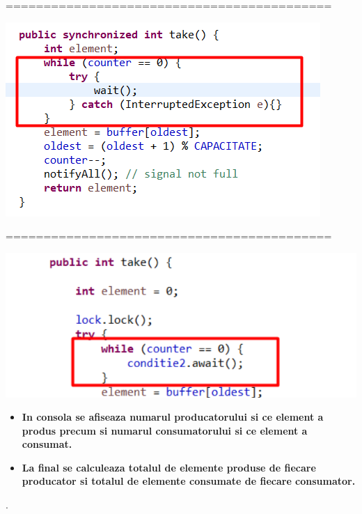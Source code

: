 \documentclass[14pt]{article}
\begin{document}
===========================================

\begin{center}\includegraphics[height=2.3 in, width = 3.5 in]{consStop2.png}
\end{center}

===========================================

\begin{center}\includegraphics[height=1.5 in, width = 3.5 in]{consStop3.png}
\end{center}

\newpage

\begin{itemize}
\item \textbf{In consola se afiseaza numarul producatorului si ce element a produs precum si numarul consumatorului si ce element a consumat.}
\end{itemize}


\begin{itemize}
\item \textbf{La final se calculeaza totalul de elemente produse de fiecare producator si totalul de elemente consumate de fiecare consumator.}
\end{itemize}
.
\end{document}

